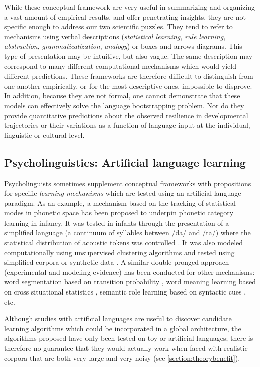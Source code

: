 \documentclass[jou,apacite]{apa6}
\begin{document}
While these conceptual framework are very useful in summarizing and organizing a vast amount of empirical results, and offer penetrating insights, they are not specific enough to address our two scientific puzzles. They tend to refer to mechanisms using verbal descriptions (\emph{statistical learning}, \emph{rule learning}, \emph{abstraction}, \emph{grammaticalization}, \emph{analogy}) or boxes and arrows diagrams.  This type of presentation may be intuitive, but also vague. The same description may correspond to many different computational mechanisms which would yield different predictions. These frameworks are therefore difficult to distinguish from one another empirically, or for the most descriptive ones, impossible to disprove.  In addition, because they are not formal, one cannot demonstrate that these models can effectively solve the language bootstrapping problem. Nor do they provide quantitative predictions about the observed resilience in developmental trajectories or their variations as a function of language input at the individual, linguistic or cultural level.

\subsection{Psycholinguistics: Artificial language learning}

Psycholinguists sometimes supplement conceptual frameworks with propositions for specific \emph{learning mechanisms} which are tested using an artificial language paradigm. As an example, a mechanism based on the tracking of statistical modes in phonetic space has been proposed to underpin phonetic category learning in infancy. It was tested in infants through the presentation of a simplified language (a continuum of syllables between /da/ and /ta/) where the statistical distribution of acoustic tokens was controlled \cite{maye_2002}. It was also modeled computationally using unsupervised clustering algorithms and tested using simplified corpora or synthetic data \cite{vallabha_2007,mcmurray_2009}. A similar double-pronged approach (experimental and modeling evidence) has been conducted for other mechanisms: word segmentation based on transition probability  \cite{saffran_1996,daland_2011},  word meaning learning based on cross situational statistics \cite{yu_2007,smith_2011,siskind_1996}, semantic role learning based on syntactic cues \cite{connor_2013}, etc. 



Although studies with artificial languages are useful to discover candidate learning algorithms which could be incorporated in a global architecture, the algorithms proposed have only been tested on toy or artificial languages; there is therefore no guarantee that they would actually work when faced with realistic corpora that are both very large and very noisy (see \ref{section:theorybenefit}).
\end{document}

